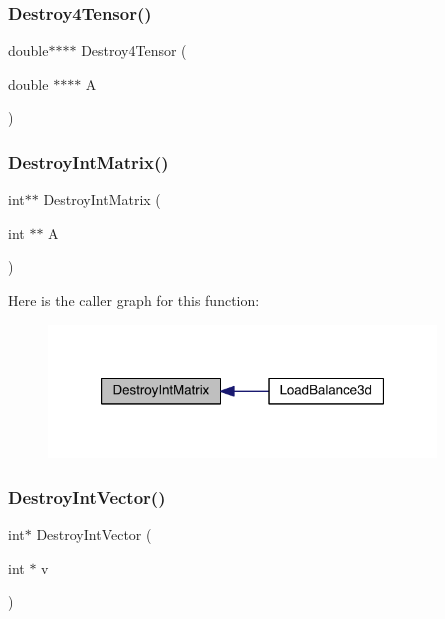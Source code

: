 \subsubsection{\texorpdfstring{Destroy4\+Tensor()}{Destroy4Tensor()}}
{\footnotesize\ttfamily double$\ast$$\ast$$\ast$$\ast$ Destroy4\+Tensor (\begin{DoxyParamCaption}\item[{double $\ast$$\ast$$\ast$$\ast$}]{A }\end{DoxyParamCaption})}

\mbox{\label{a00602_a60e426d6cf7506409d3d88171c1335fb}} 
\subsubsection{\texorpdfstring{Destroy\+Int\+Matrix()}{DestroyIntMatrix()}}
{\footnotesize\ttfamily int$\ast$$\ast$ Destroy\+Int\+Matrix (\begin{DoxyParamCaption}\item[{int $\ast$$\ast$}]{A }\end{DoxyParamCaption})}

Here is the caller graph for this function\+:\nopagebreak
\begin{figure}[H]
\begin{center}
\leavevmode
\includegraphics[width=292pt]{a00602_a60e426d6cf7506409d3d88171c1335fb_icgraph}
\end{center}
\end{figure}
\mbox{\label{a00602_a77ea0d4c74ea8c7599ebe5c15ecbb7fa}} 
\subsubsection{\texorpdfstring{Destroy\+Int\+Vector()}{DestroyIntVector()}}
{\footnotesize\ttfamily int$\ast$ Destroy\+Int\+Vector (\begin{DoxyParamCaption}\item[{int $\ast$}]{v }\end{DoxyParamCaption})}


